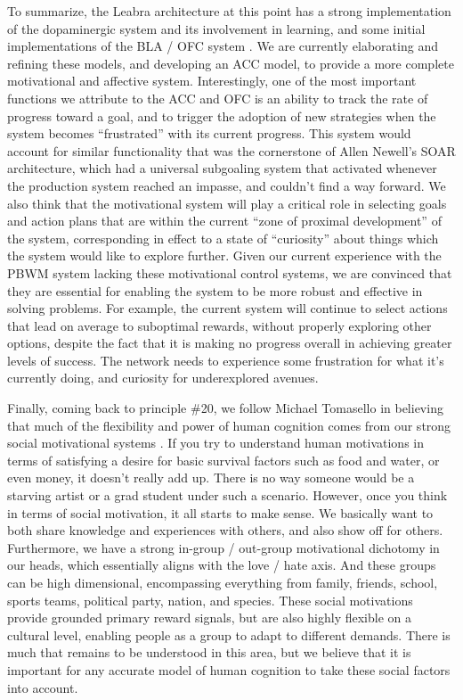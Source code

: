 \documentclass[11pt,twoside]{article}
\begin{document}
To summarize, the Leabra architecture at this point has a strong
implementation of the dopaminergic system and its involvement in learning, and
some initial implementations of the BLA / OFC system
\cite{PauliHazyOReilly12}.  We are currently elaborating and refining these
models, and developing an ACC model, to provide a more complete motivational
and affective system.  Interestingly, one of the most important functions we
attribute to the ACC and OFC is an ability to track the rate of progress
toward a goal, and to trigger the adoption of new strategies when the system
becomes ``frustrated'' with its current progress.  This system would account
for similar functionality that was the cornerstone of Allen Newell's SOAR
architecture, which had a universal subgoaling system that activated whenever
the production system reached an impasse, and couldn't find a way forward.  We
also think that the motivational system will play a critical role in selecting
goals and action plans that are within the current ``zone of proximal
development'' of the system, corresponding in effect to a state of
``curiosity'' about things which the system would like to explore further.
Given our current experience with the PBWM system lacking these motivational
control systems, we are convinced that they are essential for enabling the
system to be more robust and effective in solving problems.  For example, the
current system will continue to select actions that lead on average to
suboptimal rewards, without properly exploring other options, despite the fact
that it is making no progress overall in achieving greater levels of success.
The network needs to experience some frustration for what it's currently
doing, and curiosity for underexplored avenues.

Finally, coming back to principle \#20, we follow Michael Tomasello in believing that much of the flexibility and power of human cognition comes from our strong social motivational systems \cite{Tomasello01}.  If you try to
understand human motivations in terms of satisfying a desire for basic
survival factors such as food and water, or even money, it doesn't really add
up.  There is no way someone would be a starving artist or a grad student
under such a scenario.  However, once you think in terms of social motivation,
it all starts to make sense.  We basically want to both share knowledge and
experiences with others, and also show off for others.  Furthermore, we have a
strong in-group / out-group motivational dichotomy in our heads, which
essentially aligns with the love / hate axis.  And these groups can be high
dimensional, encompassing everything from family, friends, school, sports
teams, political party, nation, and species.  These social motivations provide
grounded primary reward signals, but are also highly flexible on a cultural
level, enabling people as a group to adapt to different demands.  There is
much that remains to be understood in this area, but we believe that it is
important for any accurate model of human cognition to take these social
factors into account.
\end{document}
